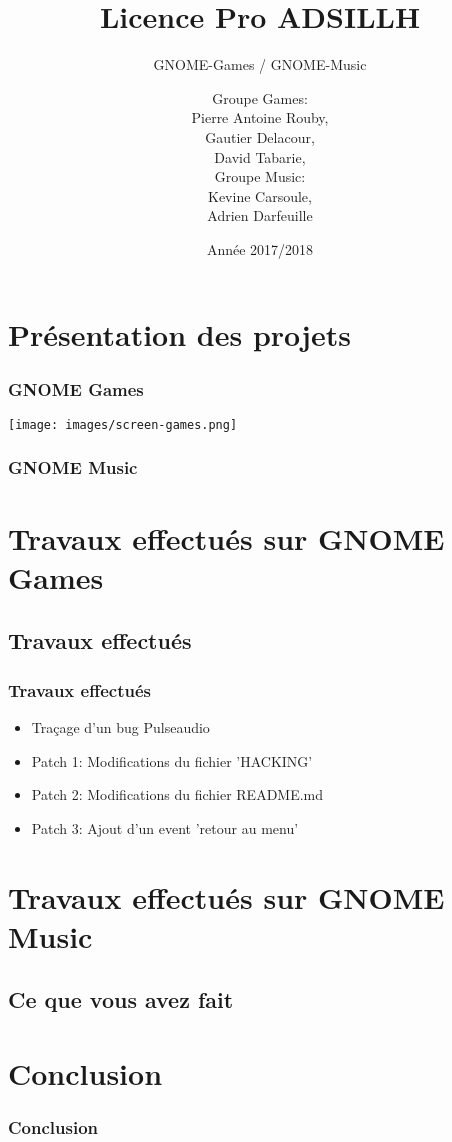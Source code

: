 \documentclass{beamer}
\title{Licence Pro ADSILLH}
\subtitle{GNOME-Games / GNOME-Music}
\author{Groupe Games:\\ Pierre Antoine Rouby,\\ Gautier Delacour,\\
  David Tabarie,\\
  \vspace{0.8cm}
  Groupe Music:\\ Kevine Carsoule,\\ Adrien Darfeuille}
\date{Année 2017/2018}
\begin{document}
\frame{\titlepage}

\section{Présentation des projets}

\begin{frame}
  \frametitle{GNOME Games}
  \texttt{[image: images/screen-games.png]}
\end{frame}

\begin{frame}
  \frametitle{GNOME Music}
\end{frame}

\section{Travaux effectués sur GNOME Games}
\subsection{Travaux effectués}
\begin{frame}
  \frametitle{Travaux effectués}
  \begin{itemize}
    \item Traçage d'un bug Pulseaudio
    \item Patch 1: Modifications du fichier 'HACKING'
    \item Patch 2: Modifications du fichier README.md
    \item Patch 3: Ajout d'un event 'retour au menu'
  \end{itemize}
\end{frame}

\section{Travaux effectués sur GNOME Music}
\subsection{Ce que vous avez fait}
\begin{frame}
  \frametitle{}
\end{frame}

\section{Conclusion}
\begin{frame}
  \frametitle{Conclusion}
\end{frame}
\end{document}
